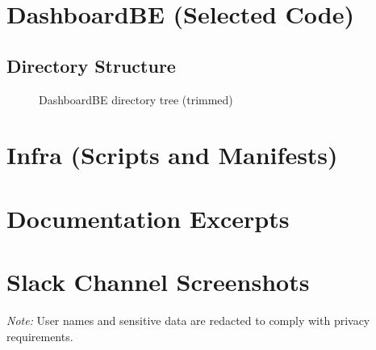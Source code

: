 \documentclass[11pt, a4paper, oneside, listof=totoc]{scrartcl}
\begin{document}
        \section{DashboardBE (Selected Code)}\label{app:dashboardbe}

            \subsection*{Directory Structure}
            \begin{figure}[H]
                \centering
                \caption{DashboardBE directory tree (trimmed)}\label{fig:dashboardbe-tree}
            \end{figure}

        \cleardoublepage
            

        \section{Infra (Scripts and Manifests)}\label{app:infra}

            \begin{flushleft}
                \label{fig:infra-tree}
            \end{flushleft}


        \cleardoublepage

        \section{Documentation Excerpts}\label{app:docs}

        \cleardoublepage

        \section{Slack Channel Screenshots}\label{app:slack}

            \noindent\textit{Note:} User names and sensitive data are redacted to comply with privacy requirements.
\end{document}
